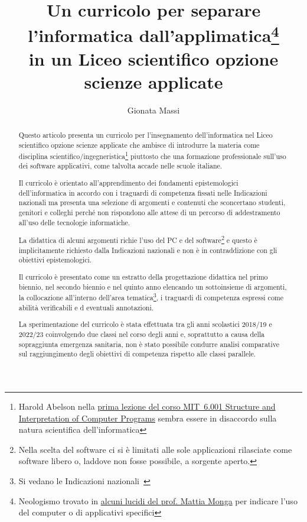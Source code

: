 \documentclass[a4paper]{easychair}
\title{Un curricolo per separare l'informatica dall'applimatica\thanks{Neologismo %
trovato in \href{https://aladdin.unimi.it/materiali/talk/2012_mirabilandia.pdf}%
{alcuni lucidi del prof. Mattia Monga} per indicare l'uso del computer o di applicativi specifici}\\ in un %
Liceo scientifico opzione scienze applicate}
\author{
Gionata Massi\institute{
  IIS Savoia Benincasa, Ancona (AN)
 }
}
\institute{
  IIS Savoia Benincasa, Ancona (AN)\\
  \email{gionata.massi@savoiabenincasa.it}
}
\begin{document}
\maketitle

\begin{abstract}
Questo articolo presenta un curricolo per l'insegnamento dell'informatica
nel Liceo scientifico opzione scienze applicate che ambisce di introdurre
la materia come disciplina scientifico/ingegneristica\footnote{Harold Abelson nella
\href{https://youtu.be/-J_xL4IGhJA}{prima lezione del corso MIT~6.001
Structure and Interpretation of Computer Programs}
sembra essere in disaccordo sulla natura scientifica dell'informatica
} piuttosto che una formazione professionale sull'uso dei software applicativi,
come talvolta accade nelle scuole italiane.

Il curricolo è orientato all'apprendimento dei fondamenti epistemologici
dell'informatica in accordo con i traguardi di competenza fissati 
nelle Indicazioni nazionali ma presenta una selezione di argomenti e contenuti
che sconcertano studenti, genitori e colleghi perché non rispondono alle attese di un
percorso di addestramento all'uso delle tecnologie informatiche.

La didattica di alcuni argomenti richie l'uso del PC e
del software\footnote{Nella scelta del software ci si è limitati
alle sole applicazioni rilasciate come software libero o, laddove non fosse
possibile, a sorgente aperto.} e questo è implicitamente richiesto dalla Indicazioni nazionali
e non è in contraddizione con gli obiettivi epistemologici.

Il curricolo è presentato come un estratto della progettazione didattica
nel primo biennio, nel secondo biennio e nel quinto anno
elencando un sottoinsieme di argomenti,
la collocazione all'interno dell'area tematica\footnote{Si vedano le Indicazioni nazionali~\cite{IlMinistro2010}},
i traguardi di competenza espressi come abilità verificabili e%
d eventuali annotazioni.

La sperimentazione del curricolo è stata effettuata tra gli anni scolastici
2018/19 e 2022/23 coinvolgendo due classi nel corso degli anni e, soprattutto
a causa della sopraggiunta emergenza sanitaria, non è stato possibile condurre analisi
comparative sul raggiungimento degli obiettivi di competenza rispetto alle
classi parallele.


\end{abstract}
\end{document}
